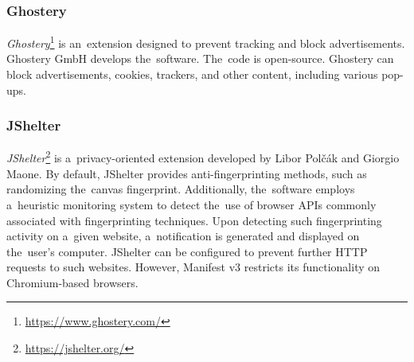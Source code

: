 \subsubsection{Ghostery}
\textit{Ghostery}\footnote{\url{https://www.ghostery.com/}} is an~extension designed to prevent tracking and block advertisements. Ghostery GmbH develops the~software. The~code is open-source. Ghostery can block advertisements, cookies, trackers, and other content, including various pop-ups.

\subsubsection{JShelter}
\label{jshelter-introduction}
\textit{JShelter}\footnote{\url{https://jshelter.org/}} is a~privacy-oriented extension developed by Libor Polčák and Giorgio Maone. By default, JShelter provides anti-fingerprinting methods, such as randomizing the~canvas fingerprint. Additionally, the~software employs a~heuristic monitoring system to detect the~use of browser APIs commonly associated with fingerprinting techniques. Upon detecting such fingerprinting activity on a~given website, a~notification is generated and displayed on the~user's computer. JShelter can be configured to prevent further HTTP requests to such websites. However, Manifest v3 restricts its functionality on Chromium-based browsers.